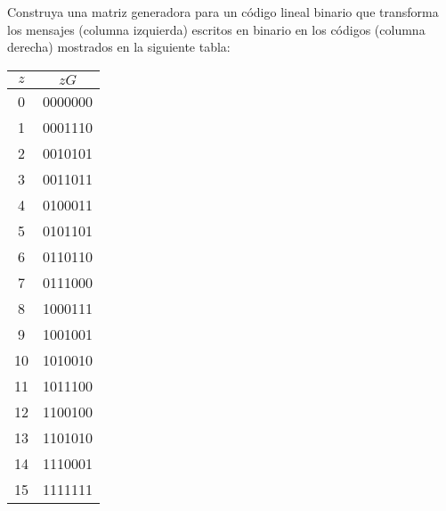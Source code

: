 
Construya una matriz generadora para un código lineal binario que transforma los mensajes (columna izquierda) escritos en binario en los códigos (columna derecha) mostrados en la siguiente tabla:

\begin{center}
\begin{tabular}{c|c}
$z$ & $zG$ \\
\hline
0 & 0000000 \\
1 & 0001110 \\
2 & 0010101 \\
3 & 0011011 \\
4 & 0100011 \\
5 & 0101101 \\
6 & 0110110 \\
7 & 0111000 \\
8 & 1000111 \\
9 & 1001001 \\
10 & 1010010 \\
11 & 1011100 \\
12 & 1100100 \\
13 & 1101010 \\
14 & 1110001 \\
15 & 1111111 \\
\end{tabular}
\end{center}

